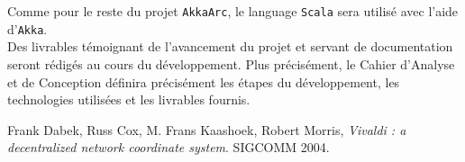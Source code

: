 \documentclass[11pt,a4paper]{article}
\begin{document}
Comme pour le reste du projet \texttt{AkkaArc}, le language \texttt{Scala} sera utilisé avec l'aide d'\texttt{Akka}.\\

Des livrables témoignant de l'avancement du projet et servant de documentation seront rédigés au cours du développement.
Plus précisément, le Cahier d'Analyse et de Conception définira précisément les étapes du développement, les technologies utilisées et les livrables fournis.

\begin{thebibliography}{9}

  Frank Dabek, Russ Cox, M. Frans Kaashoek, Robert Morris,
  \emph{Vivaldi : a decentralized network coordinate system}.
  SIGCOMM 2004.

\end{thebibliography}
\end{document}
